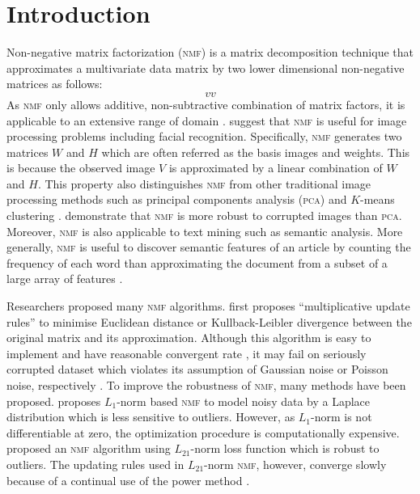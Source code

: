 \section{Introduction\label{chapter1}}
Non-negative matrix factorization (\textsc{nmf}) is a matrix decomposition technique that approximates a multivariate data matrix by two lower dimensional non-negative matrices as follows:
\begin{equation*}
  vv
\end{equation*}
As \textsc{nmf} only allows additive, non-subtractive combination of matrix factors, it is applicable to an extensive range of domain . \citet{lee1999learning} suggest that \textsc{nmf} is useful for image processing problems including facial recognition. Specifically, \textsc{nmf} generates two matrices $W$ and $H$ which are often referred as the basis images and weights. This is because the observed image $V$ is approximated by a linear combination of $W$ and $H$. This property also distinguishes \textsc{nmf} from other traditional image processing methods such as principal components analysis (\textsc{pca}) and $K$-means clustering . \citet{guillamet2002non} demonstrate that \textsc{nmf} is more robust to corrupted images than \textsc{pca}.
Moreover, \textsc{nmf} is also applicable to text mining such as semantic analysis. More generally, \textsc{nmf} is useful to discover semantic features of an article by counting the frequency of each word than approximating the document from a subset of a large array of features \citep{lee1999learning}.

Researchers proposed many \textsc{nmf} algorithms. \citet{lee2001algorithms} first proposes ``multiplicative update rules'' to minimise Euclidean distance or Kullback-Leibler divergence between the original matrix and its approximation. Although this algorithm is easy to implement and have reasonable convergent rate \citep{lee2001algorithms}, it may fail on seriously corrupted dataset which violates its assumption of Gaussian noise or Poisson noise, respectively \citep{guan2017truncated}.  To improve the robustness of \textsc{nmf}, many methods have been proposed. \citet{lam2008non} proposes ${L_1}$-norm based \textsc{nmf} to model noisy data by a Laplace distribution which is less sensitive to outliers. However, as $L_1$-norm is not differentiable at zero, the optimization procedure is computationally expensive. \citet{kong2011robust} proposed an \textsc{nmf} algorithm using $L_{21}$-norm loss function which is robust to outliers. The updating rules used in $L_{21}$-norm \textsc{nmf}, however, converge slowly because of a continual use of the power method \citep{guan2017truncated}.

